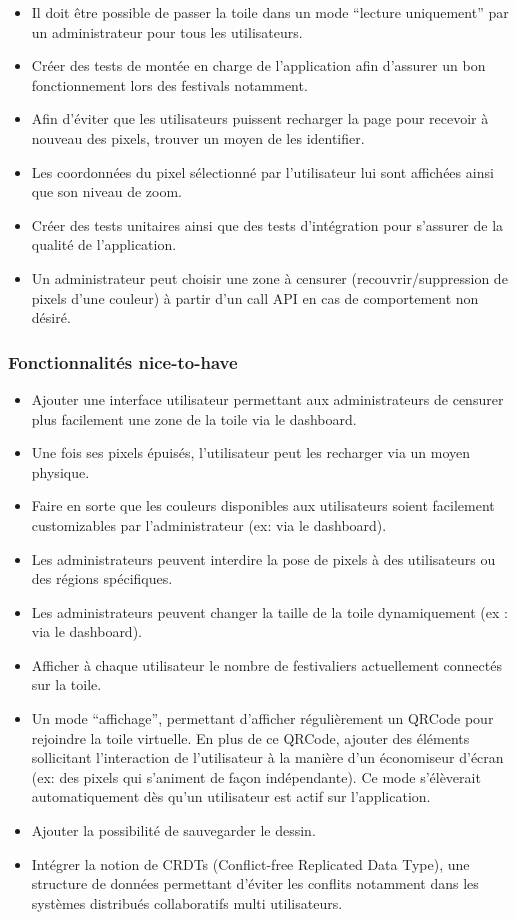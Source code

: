 \begin{itemize}
  \item Il doit être possible de passer la toile dans un mode “lecture uniquement” par un administrateur pour tous les utilisateurs.
  \item Créer des tests de montée en charge de l'application afin d'assurer un bon fonctionnement lors des festivals notamment.
  \item Afin d'éviter que les utilisateurs puissent recharger la page pour recevoir à nouveau des pixels, trouver un moyen de les identifier.
  \item Les coordonnées du pixel sélectionné par l'utilisateur lui sont affichées ainsi que son niveau de zoom.
  \item Créer des tests unitaires ainsi que des tests d'intégration pour s'assurer de la qualité de l'application.
  \item Un administrateur peut choisir une zone à censurer (recouvrir/suppression de pixels d'une couleur) à partir d'un call API en cas de comportement non désiré.
\end{itemize}

\subsubsection{Fonctionnalités \guillemotleft nice-to-have\guillemotright}

\begin{itemize}
  \item Ajouter une interface utilisateur permettant aux administrateurs de censurer plus facilement une zone de la toile via le dashboard.
  \item Une fois ses pixels épuisés, l'utilisateur peut les recharger via un moyen physique.
  \item Faire en sorte que les couleurs disponibles aux utilisateurs soient facilement customizables par l'administrateur (ex: via le dashboard).
  \item Les administrateurs peuvent interdire la pose de pixels à des utilisateurs ou des régions spécifiques.
  \item Les administrateurs peuvent changer la taille de la toile dynamiquement (ex : via le dashboard).
  \item Afficher à chaque utilisateur le nombre de festivaliers actuellement connectés sur la toile.
  \item Un mode “affichage”, permettant d'afficher régulièrement un QRCode pour rejoindre la toile virtuelle. En plus de ce QRCode, ajouter des éléments sollicitant l'interaction de l'utilisateur à la manière d'un économiseur d'écran (ex: des pixels qui s'animent de façon indépendante). Ce mode s'élèverait automatiquement dès qu'un utilisateur est actif sur l'application.
  \item Ajouter la possibilité de sauvegarder le dessin.
  \item Intégrer la notion de CRDTs (Conflict-free Replicated Data Type), une structure de données permettant d'éviter les conflits notamment dans les systèmes distribués collaboratifs multi utilisateurs.
\end{itemize}

